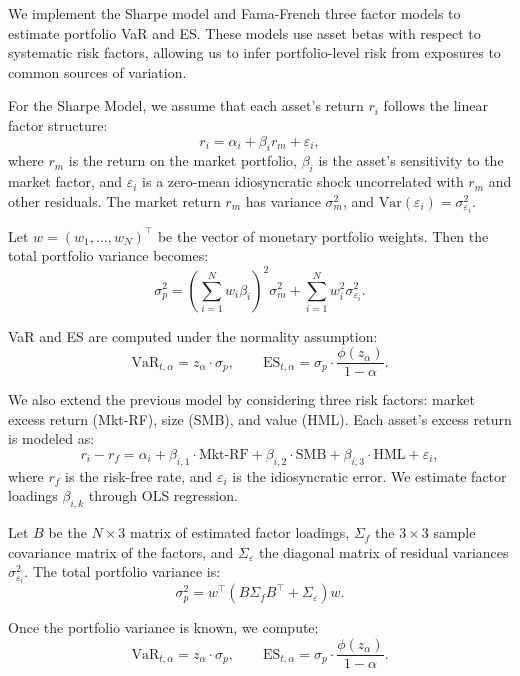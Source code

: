 \documentclass[12pt]{article}
\begin{document}
\vspace{0.6em}

We implement the Sharpe model and Fama-French three factor models to estimate portfolio VaR and ES. These models use asset betas with respect to systematic risk factors, allowing us to infer portfolio-level risk from exposures to common sources of variation.

For the Sharpe Model, we assume that each asset’s return $r_i$ follows the linear factor structure:
\[
r_i = \alpha_i + \beta_i r_m + \varepsilon_i,
\]
where $r_m$ is the return on the market portfolio, $\beta_i$ is the asset's sensitivity to the market factor, and $\varepsilon_i$ is a zero-mean idiosyncratic shock uncorrelated with $r_m$ and other residuals. The market return $r_m$ has variance $\sigma_m^2$, and $\mathrm{Var}(\varepsilon_i) = \sigma_{\varepsilon_i}^2$.

Let $w = (w_1, \dots, w_N)^\top$ be the vector of monetary portfolio weights. Then the total portfolio variance becomes:
\[
\sigma_p^2 = \left(\sum_{i=1}^N w_i \beta_i\right)^2 \sigma_m^2 + \sum_{i=1}^N w_i^2 \sigma_{\varepsilon_i}^2.
\]

VaR and ES are computed under the normality assumption:
\[
\text{VaR}_{t,\alpha} = z_\alpha \cdot \sigma_p, \qquad
\text{ES}_{t,\alpha} = \sigma_p \cdot \frac{\phi(z_\alpha)}{1 - \alpha}.
\]
 
We also extend the previous model by considering three risk factors: market excess return (Mkt-RF), size (SMB), and value (HML). Each asset’s excess return is modeled as:
\[
r_i - r_f = \alpha_i + \beta_{i,1} \cdot \text{Mkt-RF} + \beta_{i,2} \cdot \text{SMB} + \beta_{i,3} \cdot \text{HML} + \varepsilon_i,
\]
where $r_f$ is the risk-free rate, and $\varepsilon_i$ is the idiosyncratic error. We estimate factor loadings $\beta_{i,k}$ through OLS regression.

Let $B$ be the $N \times 3$ matrix of estimated factor loadings, $\Sigma_f$ the $3 \times 3$ sample covariance matrix of the factors, and $\Sigma_\varepsilon$ the diagonal matrix of residual variances $\sigma_{\varepsilon_i}^2$. The total portfolio variance is:
\[
\sigma_p^2 = w^\top (B \Sigma_f B^\top + \Sigma_\varepsilon) w.
\]

Once the portfolio variance is known, we compute:
\[
\text{VaR}_{t,\alpha} = z_\alpha \cdot \sigma_p, \qquad
\text{ES}_{t,\alpha} = \sigma_p \cdot \frac{\phi(z_\alpha)}{1 - \alpha}.
\]

\vspace{1em}
\underline{}
\end{document}
